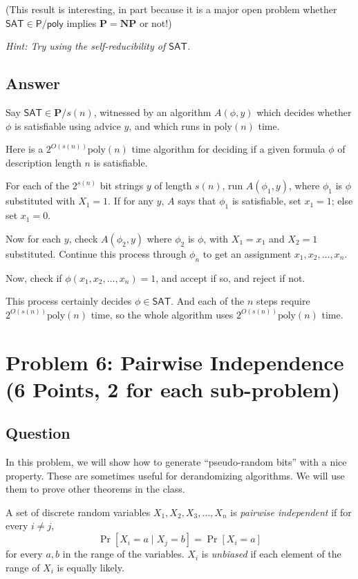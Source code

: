 \documentclass{article}
\renewcommand{\P}{\mathbf{P}}
\newcommand{\NP}{\mathbf{NP}}
\def \poly{\text{poly}}
\begin{document}
(This result is interesting, in part because it is a major open problem whether $\textsf{SAT} \in \mathsf{P}/\mathsf{poly}$ implies $\P = \NP$ or not!)

\emph{Hint: Try using the self-reducibility of $\mathsf{SAT}$.}

\subsection*{Answer}

Say $\textsf{SAT} \in \P/s(n)$, witnessed by an algorithm $A(\phi, y)$ which decides whether $\phi$ is satisfiable using advice $y$, and which runs in $\poly(n)$ time.

Here is a $2^{O(s(n))} \poly(n)$ time algorithm for deciding if a given formula $\phi$ of description length $n$ is satisfiable.

For each of the $2^{s(n)}$ bit strings $y$ of length $s(n)$, run $A(\phi_1, y)$, where $\phi_1$ is $\phi$ substituted with $X_1 = 1$.
If for any $y$, $A$ says that $\phi_1$ is satisfiable, set $x_1 = 1$; else set $x_1 = 0$.

Now for each $y$, check $A(\phi_2, y)$ where $\phi_2$ is $\phi$, with $X_1 = x_1$ and $X_2 = 1$ substituted.  Continue this process through $\phi_n$ to get an assignment $x_1, x_2, \dots, x_n$.

Now, check if $\phi(x_1, x_2, \dots, x_n) = 1$, and accept if so, and reject if not.

This process certainly decides $\phi \in \mathsf{SAT}$.
And each of the $n$ steps require $2^{O(s(n))} \poly(n)$ time, so the whole algorithm uses $2^{O(s(n))} \poly(n)$ time.

\newpage
\section*{Problem 6: Pairwise Independence (6 Points, 2 for each sub-problem)}  

\subsection*{Question}
In this problem, we will show how to generate ``pseudo-random bits'' with a nice property. These are sometimes useful for derandomizing algorithms. We will use them to prove other theorems in the class.

A set of discrete random variables $X_1, X_2, X_3, \ldots, X_n$ is {\em pairwise independent} if for every $i \neq j$,
\[\Pr[ X_i = a \mid X_j = b ] = \Pr[ X_i = a]\] for every $a,b$ in the range of the variables.
$X_i$ is {\em unbiased} if each element of the range of $X_i$ is equally likely.
\end{document}
